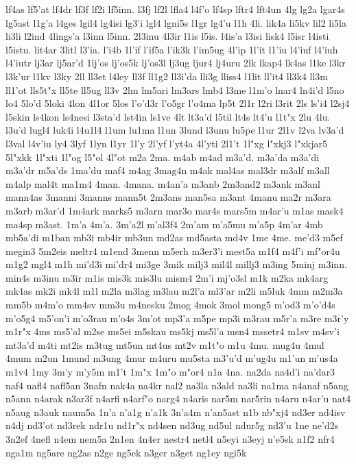 {lf4as
lf5'at
lf4dr
lf3f
lf2i
lf5inn.
l3fj
lf2l
lfla4
l4f'o
lf4sp
lftr4
lft4un
4lg
lg2a
lgar4s
lg5ast
l1g'a
l4ges
lgil4
lg4isi
lg3'i
lgl4
lgni5s
l1gr
lg4'u
l1h
4li.
lik4a
li5kv
lil2
li5la
li3li
l2ind
4lings'a
l3inn
l5inn.
2l3inu
4l3ir
l1is
l5is.
l4is'a
l3isi
lisk4
l5isr
l4isti
l5istu.
lit4ar
3litl
l3'ia.
l'i4b
1l'if
l'if5a
l'ik3k
l'im5ug
4l'ip
1l'it
l1'iu
l4'iuf
l4'iuh
l4'iutr
lj3ar
lj5ar'd
1lj'os
lj'os5k
lj'os3l
lj3ug
ljur4
lj4uru
2lk
lkap4
lk4as
l1ke
l3kr
l3k'ur
l1kv
l3ky
2ll
ll3et
l4ley
ll3f
ll1g2
ll3i'da
lli3g
lliss4
l1lit
ll'it4
ll3k4
ll3m
ll1'ot
lls5t"x
ll5te
ll5ug
ll3v
2lm
lm5ari
lm3ars
lmb4
l3me
l1m'o
lnar4
ln4i'd
l5no
lo4
5lo'd
5loki
4lon
4l1or
5los
l'o'd3r
l'o5gr
l'o4ma
lp5t
2l1r
l2ri
l3rit
2ls
ls'i4
l2sj4
l5skin
ls4kon
ls4nesi
l3sta'd
lst4in
ls1ve
4lt
lt3a'd
l5til
lt4s
lt4'u
l1t"x
2lu
4lu.
l3u'd
lugl4
luk4i
l4u1l4
l1um
lu1ma
l1un
3lund
l3unu
lu5pe
l1ur
2l1v
l2va
lv3a'd
l3val
l4v'iu
ly4
3lyf
1lyn
l1yr
1l'y
2l'yf
l'yt4a
4l'yti
2l1't
1l"xg
l"xkj3
l"xkjar5
5l"xkk
1l"xti
1l"og
l5"ol
4l"ot
m2a
2ma.
m4ab
m4ad
m3a'd.
m3a'da
m3a'di
m3a'dr
m5a'ds
1ma'du
maf4
m4ag
3mag4n
m4ak
mal4as
mal3dr
m3alf
m3all
m4alp
mal4t
ma1m4
4man.
4mana.
m4an'a
m3anb
2m3and2
m3ank
m3anl
mann4as
3manni
3manns
mann5t
2m3ans
man5sa
m3ant
4manu
ma2r
m3ara
m3arb
m3ar'd
1m4ark
marks5
m3arn
mar3o
mar4s
mars5m
m4ar'u
m1as
mask4
ma4sp
m3ast.
1m'a
4m'a.
3m'a2l
m'al3f4
2m'am
m'a5mu
m'a5p
4m'ar
4mb
mb5a'di
m1ban
mb3i
mb4ir
mb3un
md2as
md5asta
md4v
1me
4me.
me'd3
m5ef
megin3
5m2eis
meltr4
m1end
3menn
m5erh
m3er3'i
mest5a
m1f4
m4f'i
mf"or4u
m1g2
mgl4
m1h
mi'd3i
mi'dr4
mi3ge
3mik
milj3
mil4l
millj3
m3ing
5minj
m3inn.
min4s
m3inu
m3ir
m1is
mis3k
mis3lu
mism4
2m'i
mj'o3sl
m1k
m2ka
mk4arg
mk4as
mk2i
mk4l
m1l
m2la
m3lag
m3lau
m2l'a
ml3'ar
m2li
m5luk
4mm
m2m3a
mm5b
m4m'o
mm4sv
mm3u
m4nesku
2mog
4mok
3mol
mong5
m'od3
m'o'd4s
m'o5g4
m5'on'i
m'o3rau
m'o4s
3m'ot
mp3'a
m5pe
mp3i
m3rau
m5r'a
m3re
m3r'y
m1r"x
4ms
ms5'al
m2se
ms5ei
m5skau
ms5kj
ms5l'a
msn4
mssetr4
m1sv
m4sv'i
mt3a'd
m4ti
mt2is
m3tug
mt5un
mt4us
mt2v
m1t"o
m1u
4mu.
mug4u
4mul
4mum
m2un
1mund
m3ung
4mur
m4uru
mu5sta
m3'u'd
m'ug4u
m1'un
m'us4a
m1v4
1my
3m'y
m'y5m
m1't
1m"x
1m"o
m"or4
n1a
4na.
na2da
na4d'i
na'dar3
naf4
nafl4
nafl5an
3nafn
nak4a
na4kr
nal2
na3la
n3ald
na3li
na1ma
n4anaf
n5ang
n5ann
n4arak
n3ar3f
n4arfi
n4arf"o
narg4
n4aris
nar5m
nar5rin
n4aru
n4ar'u
nat4
n5aug
n3auk
naum5a
1n'a
n'a1g
n'a1k
3n'a4m
n'an5ast
n1b
nb"xj4
nd3er
nd4isv
n4dj
nd3'ot
nd3rek
ndr1u
nd1r"x
nd4sen
nd3ug
nd5ul
ndur5g
nd3'u
1ne
ne'd2s
3n2ef
4nefl
n4em
nem5a
2n1en
4n4er
nestr4
netl4
n5eyi
n3eyj
n'e5sk
n1f2
nfr4
nga1m
ng5are
ng2as
n2ge
ng5ek
n3ger
n3get
ng1ey
ngi5k
}

